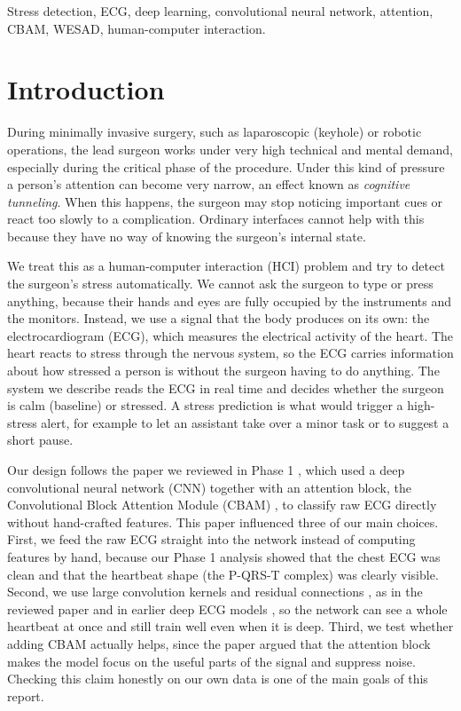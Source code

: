 \documentclass[conference]{IEEEtran}
\begin{document}
\begin{IEEEkeywords}
Stress detection, ECG, deep learning, convolutional neural network, attention,
CBAM, WESAD, human-computer interaction.
\end{IEEEkeywords}

\section{Introduction}
During minimally invasive surgery, such as laparoscopic (keyhole) or robotic
operations, the lead surgeon works under very high technical and mental demand,
especially during the critical phase of the procedure. Under this kind of
pressure a person's attention can become very narrow, an effect known as
\textit{cognitive tunneling}. When this happens, the surgeon may stop noticing
important cues or react too slowly to a complication. Ordinary interfaces cannot
help with this because they have no way of knowing the surgeon's internal state.

We treat this as a human-computer interaction (HCI) problem and try to detect
the surgeon's stress automatically. We cannot ask the surgeon to type or press
anything, because their hands and eyes are fully occupied by the instruments and
the monitors. Instead, we use a signal that the body produces on its own: the
electrocardiogram (ECG), which measures the electrical activity of the heart.
The heart reacts to stress through the nervous system, so the ECG carries
information about how stressed a person is without the surgeon having to do
anything. The system we describe reads the ECG in real time and decides whether
the surgeon is calm (baseline) or stressed. A stress prediction is what would
trigger a high-stress alert, for example to let an assistant take over a minor
task or to suggest a short pause.

Our design follows the paper we reviewed in Phase 1 \cite{reviewed}, which used a
deep convolutional neural network (CNN) together with an attention block, the
Convolutional Block Attention Module (CBAM) \cite{cbam}, to classify raw ECG
directly without hand-crafted features. This paper influenced three of our main
choices. First, we feed the raw ECG straight into the network instead of
computing features by hand, because our Phase 1 analysis showed that the chest
ECG was clean and that the heartbeat shape (the P-QRS-T complex) was clearly
visible. Second, we use large convolution kernels and residual connections
\cite{resnet}, as in the reviewed paper and in earlier deep ECG models
\cite{hannun}, so the network can see a whole heartbeat at once and still train
well even when it is deep. Third, we test whether adding CBAM actually helps,
since the paper argued that the attention block makes the model focus on the
useful parts of the signal and suppress noise. Checking this claim honestly on
our own data is one of the main goals of this report.
\end{document}
